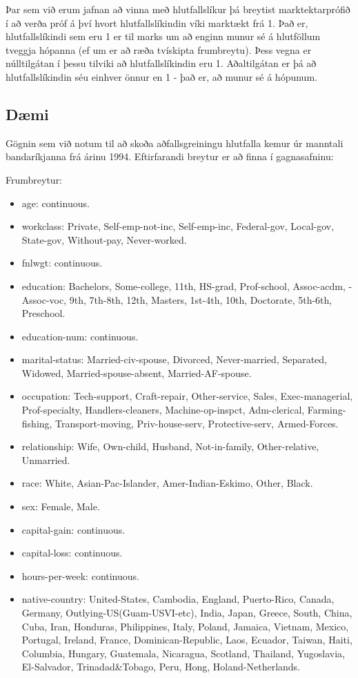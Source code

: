 \documentclass[]{book}
\providecommand{\tightlist}{%
  \setlength{\itemsep}{0pt}\setlength{\parskip}{0pt}}
\begin{document}
Þar sem við erum jafnan að vinna með hlutfallslíkur þá breytist marktektarprófið í að verða próf á því hvort hlutfallslíkindin víki marktækt frá 1. Það er, hlutfallslíkindi sem eru 1 er til marks um að enginn munur sé á hlutföllum tveggja hópanna (ef um er að ræða tvískipta frumbreytu). Þess vegna er núlltilgátan í þessu tilviki að hlutfallslíkindin eru 1. Aðaltilgátan er þá að hlutfallslíkindin séu einhver önnur en 1 - það er, að munur sé á hópunum.

\hypertarget{duxe6mi}{%
\subsection{Dæmi}\label{duxe6mi}}

Gögnin sem við notum til að skoða aðfallsgreiningu hlutfalla kemur úr manntali bandaríkjanna frá árinu 1994. Eftirfarandi breytur er að finna í gagnasafninu:

Frumbreytur:

\begin{itemize}
\tightlist
\item
  age: continuous.
\item
  workclass: Private, Self-emp-not-inc, Self-emp-inc, Federal-gov, Local-gov, State-gov, Without-pay, Never-worked.
\item
  fnlwgt: continuous.
\item
  education: Bachelors, Some-college, 11th, HS-grad, Prof-school, Assoc-acdm, - Assoc-voc, 9th, 7th-8th, 12th, Masters, 1st-4th, 10th, Doctorate, 5th-6th, Preschool.
\item
  education-num: continuous.
\item
  marital-status: Married-civ-spouse, Divorced, Never-married, Separated, Widowed, Married-spouse-absent, Married-AF-spouse.
\item
  occupation: Tech-support, Craft-repair, Other-service, Sales, Exec-managerial, Prof-specialty, Handlers-cleaners, Machine-op-inspct, Adm-clerical, Farming-fishing, Transport-moving, Priv-house-serv, Protective-serv, Armed-Forces.
\item
  relationship: Wife, Own-child, Husband, Not-in-family, Other-relative, Unmarried.
\item
  race: White, Asian-Pac-Islander, Amer-Indian-Eskimo, Other, Black.
\item
  sex: Female, Male.
\item
  capital-gain: continuous.
\item
  capital-loss: continuous.
\item
  hours-per-week: continuous.
\item
  native-country: United-States, Cambodia, England, Puerto-Rico, Canada, Germany, Outlying-US(Guam-USVI-etc), India, Japan, Greece, South, China, Cuba, Iran, Honduras, Philippines, Italy, Poland, Jamaica, Vietnam, Mexico, Portugal, Ireland, France, Dominican-Republic, Laos, Ecuador, Taiwan, Haiti, Columbia, Hungary, Guatemala, Nicaragua, Scotland, Thailand, Yugoslavia, El-Salvador, Trinadad\&Tobago, Peru, Hong, Holand-Netherlands.
\end{itemize}
\end{document}
